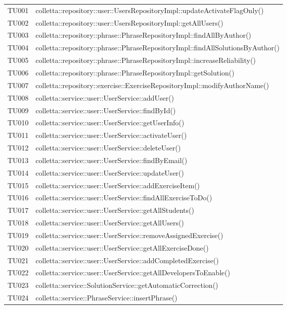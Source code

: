 \begin{tabularx}{\textwidth}{cX}
	TU001 & colletta::repository::user::UsersRepositoryImpl::updateActivateFlagOnly() \\
	TU002 & colletta::repository::user::UsersRepositoryImpl::getAllUsers() \\
	TU003 & colletta::repository::phrase::PhraseRepositoryImpl::findAllByAuthor() \\
	TU004 & colletta::repository::phrase::PhraseRepositoryImpl::findAllSolutionsByAuthor() \\
	TU005 & colletta::repository::phrase::PhraseRepositoryImpl::increaseReliability() \\
	TU006 & colletta::repository::phrase::PhraseRepositoryImpl::getSolution() \\
	TU007 & colletta::repository::exercise::ExerciseRepositoryImpl::modifyAuthorName() \\
	TU008 & colletta::service::user::UserService::addUser() \\
	TU009 & colletta::service::user::UserService::findById() \\
	TU010 & colletta::service::user::UserService::getUserInfo() \\
	TU011 & colletta::service::user::UserService::activateUser() \\
	TU012 & colletta::service::user::UserService::deleteUser() \\
	TU013 & colletta::service::user::UserService::findByEmail() \\
	TU014 & colletta::service::user::UserService::updateUser() \\
	TU015 & colletta::service::user::UserService::addExerciseItem() \\
	TU016 & colletta::service::user::UserService::findAllExerciseToDo() \\
	TU017 & colletta::service::user::UserService::getAllStudents() \\
	TU018 & colletta::service::user::UserService::getAllUsers() \\
	TU019 & colletta::service::user::UserService::removeAssignedExercise() \\
	TU020 & colletta::service::user::UserService::getAllExerciseDone() \\
	TU021 & colletta::service::user::UserService::addCompletedExercise() \\
	TU022 & colletta::service::user::UserService::getAllDevelopersToEnable() \\
	TU023 & colletta::service::SolutionService::getAutomaticCorrection() \\
	TU024 & colletta::service::PhraseService::insertPhrase() \\

\end{tabularx}

